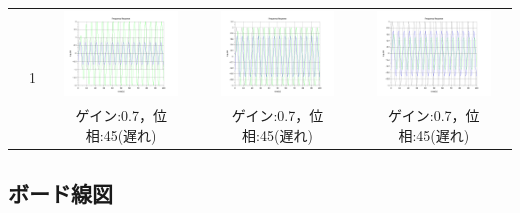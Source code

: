 \documentclass[a4paper,11pt]{jsarticle}
\begin{document}
\begin{enumerate}
\begin{table}[H]
\begin{tabular}{|c|c|c|c|c|}
             &
            \multirow{2}{*}{1}
             &
            \begin{minipage}{45mm}
              \centering
              \includegraphics[width=3cm,clip]{picture/3.png}
            \end{minipage}
             &
            \begin{minipage}{45mm}
              \centering
              \includegraphics[width=3cm,clip]{picture/6.png}
            \end{minipage}
             &
            \begin{minipage}{45mm}
              \centering
              \includegraphics[width=3cm,clip]{picture/9.png}
            \end{minipage}
            \\\cline{3-5}


             &

             &
            ゲイン:0.7，位相:45(遅れ)
             &
            ゲイン:0.7，位相:45(遅れ)
             &
            ゲイン:0.7，位相:45(遅れ)
            \\\hline
          \end{tabular}
          \label{T:3-2-2}
        \end{table}
\end{enumerate}

\subsection{ボード線図}
\end{document}
